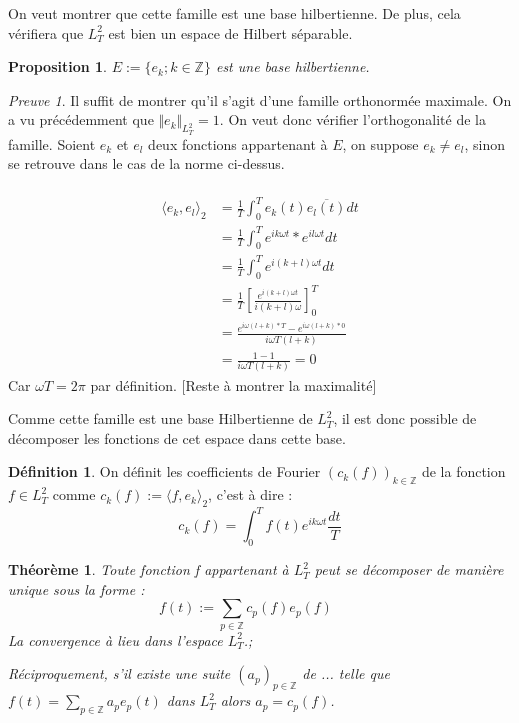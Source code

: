 \documentclass[]{article}
\newtheorem{mythm}{Théorème}
\newtheorem{myproposition}{Proposition}
\theoremstyle{remark}
\newtheorem{myproof}{Preuve}
\theoremstyle{definition}
\newtheorem{mydef}{Définition}
\begin{document}
			
			On veut montrer que cette famille est une base hilbertienne. De plus, cela vérifiera que $L_T^2$ est bien un espace de Hilbert séparable. 
			
			\begin{myproposition}
				$E:= \{e_k; k \in \mathbb{Z} \}$ est une base hilbertienne.
			\end{myproposition}
			
			\begin{myproof}	
				
				Il suffit de montrer qu'il s'agit d'une famille orthonormée maximale.
				On a vu précédemment que $\Vert e_k\Vert_{L_T^2} = 1$. On veut donc vérifier l'orthogonalité de la famille. 
				Soient $e_k$ et $e_l$ deux fonctions appartenant à $E$, on suppose $e_k\ne e_l$, sinon se retrouve dans le cas de la norme ci-dessus.  
				
				\begin{align*}
				\\	\langle e_k, e_l\rangle_2 & = \frac{1}{T} \int_0^T e_k(t) \overline{e_l(t)}dt 
				\\ & = \frac{1}{T} \int_0^T e^{ik\omega t} * e^{il\omega t} dt 
				\\ & = \frac{1}{T} \int_0^T e^{i(k+l)\omega t} dt 
				\\ & = \frac{1}{T}  \left[ \frac {e^{i(k+l)\omega t}} {{i(k+l)\omega}} \right] _0^T
				\\ & = \frac {e^{i\omega (l + k)*T} - e^{i\omega(l + k) * 0}} {i\omega T(l + k)}
				\\ & = \frac {1 - 1}{i\omega T(l + k)} = 0
				\end{align*}
				Car $\omega T = 2\pi$ par définition.
				[Reste à montrer la maximalité]
				
				
			\end{myproof}
			
		Comme cette famille est une base Hilbertienne de $L_T^2$, il est donc possible de décomposer les fonctions de cet espace dans cette base. 
			\begin{mydef}
				On définit les coefficients de Fourier $\left(c_k(f)\right)_{k \in \mathbb{Z}} $ de la fonction  $ f \in L_T^2 $ comme $ c_k(f) := \langle f, e_k\rangle_2$, c'est à dire : 
					$$ c_k(f) = \int_{0}^{T} f(t) e^{ik\omega t} \frac{dt}{T} $$
			\end{mydef}
			
			\begin{mythm}
				Toute fonction f appartenant à $L^2_T$ peut se décomposer de manière unique sous la forme : 
				$$f(t):= \sum_{p \in \mathbb{Z}} c_p(f)e_p(f) \qquad $$
				La convergence à lieu dans l'espace $L^2_T$.;
				
				Réciproquement, s'il existe une suite $(a_p)_{p \in \mathbb{Z}}$ de  ... telle que $f(t) = \sum_{p\in \mathbb{Z}}a_p e_p(t)$ dans $L^2_T$ alors $a_p=c_p(f)$.
			\end{mythm}
			
\end{document}
